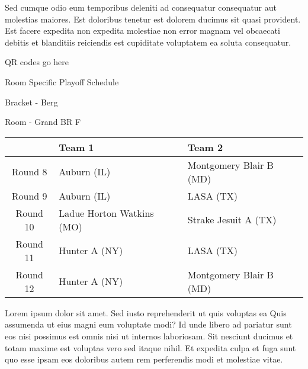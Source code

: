 \documentclass{article}%
\begin{document}
\newline%
Sed cumque odio eum temporibus deleniti ad consequatur consequatur aut molestias maiores. Est doloribus tenetur est dolorem ducimus sit quasi provident. Est facere expedita non expedita molestiae non error magnam vel obcaecati debitis et blanditiis reiciendis est cupiditate voluptatem ea soluta consequatur.%
\vspace*{140pt}%
\begin{center}%
\begin{Huge}%
QR codes go here%
\end{Huge}%
\end{center}%
\newpage%
\begin{center}%
\begin{Huge}%
Room Specific Playoff Schedule%
\end{Huge}%
\vspace*{8pt}%
\linebreak%
\begin{Large}%
Bracket {-} Berg%
\end{Large}%
\vspace*{8pt}%
\linebreak%
\vspace*{8pt}%
\begin{Large}%
Room {-} Grand BR F%
\end{Large}%
\end{center}%
%
\begin{tabularx}{\textwidth}{|c|Y|Y|}%
\hline%
&Team 1&Team 2\\%
\hline%
Round 8&Auburn (IL)&Montgomery Blair B (MD)\\%
Round 9&Auburn (IL)&LASA (TX)\\%
Round 10&Ladue Horton Watkins (MO)&Strake Jesuit A (TX)\\%
Round 11&Hunter A (NY)&LASA (TX)\\%
Round 12&Hunter A (NY)&Montgomery Blair B (MD)\\%
\hline%
\end{tabularx}%
\vspace*{8pt}%
\newline%
Lorem ipsum dolor sit amet. Sed iusto reprehenderit ut quis voluptas ea Quis assumenda ut eius magni eum voluptate modi? Id unde libero ad pariatur sunt eos nisi possimus est omnis nisi ut internos laboriosam. Sit nesciunt ducimus et totam maxime est voluptas vero sed itaque nihil. Et expedita culpa et fuga sunt quo esse ipsam eos doloribus autem rem perferendis modi et molestiae vitae.\newline%
\end{document}
